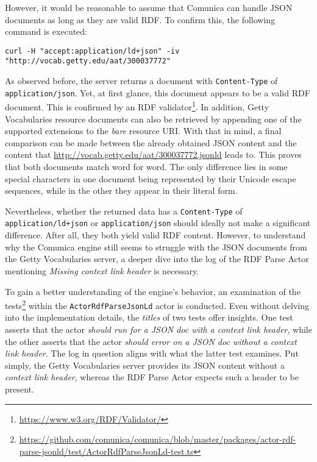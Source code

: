 However, it would be reasonable to assume that Comunica can handle JSON documents as long as they are valid RDF. To confirm this, the following command is executed:
\begin{flushleft}
    \texttt{curl -H "accept:application/ld+json" -iv "http://vocab.getty.edu/aat/300037772"}
\end{flushleft}
As observed before, the server returns a document with \texttt{Content-Type} of \texttt{application/json}. Yet, at first glance, this document appears to be a valid RDF document. This is confirmed by an RDF validator\footnote{\url{https://www.w3.org/RDF/Validator/}}. In addition, Getty Vocabularies resource documents can also be retrieved by appending one of the supported extensions to the \textit{bare} resource URI. With that in mind, a final comparison can be made between the already obtained JSON content and the content that \url{http://vocab.getty.edu/aat/300037772.jsonld} leads to. This proves that both documents match word for word. The only difference lies in some special characters in one document being represented by their Unicode escape sequences, while in the other they appear in their literal form.

Nevertheless, whether the returned data has a \texttt{Content-Type} of \texttt{application/ld+json} or \texttt{application/json} should ideally not make a significant difference. After all, they both yield valid RDF content. However, to understand why the Comunica engine still seems to struggle with the JSON documents from the Getty Vocabularies server, a deeper dive into the log of the RDF Parse Actor mentioning \textit{Missing context link header} is necessary.

To gain a better understanding of the engine's behavior, an examination of the tests\footnote{\url{https://github.com/comunica/comunica/blob/master/packages/actor-rdf-parse-jsonld/test/ActorRdfParseJsonLd-test.ts}} within the \texttt{ActorRdfParseJsonLd} actor is conducted. Even without delving into the implementation details, the \textit{titles} of two tests offer insights. One test asserts that the actor \textit{should run for a JSON doc with a context link header}, while the other asserts that the actor \textit{should error on a JSON doc without a context link header}. The log in question aligns with what the latter test examines. Put simply, the Getty Vocabularies server provides its JSON content without a \textit{context link header}, whereas the RDF Parse Actor expects such a header to be present. \citep{taelman2018comunica}

